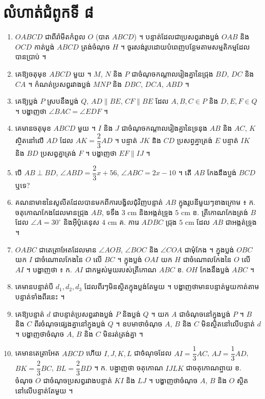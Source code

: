 \section*{លំហាត់ជំពូកទី ៨}
\begin{enumerate}[1]
  \item $OABCD$ ជាពីរ៉ាមីតកំពូល $O$ (បាត $ABCD$) ។ បន្ទាត់ដែលជាប្រសព្វរវាងប្លង់ $OAB$ និង $OCD$ កាត់ប្លង់ $ABCD$ ត្រង់ចំណុច $H$ ។ ចូរសង់រូបដោយបំពេញបន្ថែមតាមសម្មតិកម្មដែលបានប្រាប់ ។
  \item គេឱ្យចតុមុខ $ABCD$ មួយ ។ $M$, $N$ និង $P$ ជាចំណុចកណ្ដាលរៀងគ្នានៃជ្រុង $BD$, $DC$ និង $CA$ ។ កំណត់ប្រសព្វរវាងប្លង់ $MNP$ និង $DBC$, $DCA$, $ABD$ ។
  \item គេឱ្យប្លង់ $P$ ស្របនឹងប្លង់ $Q$, $AD \parallel BE$, $CF \parallel BE$ ដែល $A, B, C \in P$ និង $D, E, F \in Q$ ។ បង្ហាញថា $\angle BAC = \angle EDF$ ។
  \item គេមានចតុមុខ $ABCD$ មួយ ។ $I$ និង $J$ ជាចំណុចកណ្ដាលរៀងគ្នានៃទ្រនុង $AB$ និង $AC$, $K$ ស្ថិតនៅលើ $AD$ ដែល $AK = \dfrac{2}{3}AD$ ។ បន្ទាត់ $JK$ និង $CD$ ប្រសព្វគ្នាត្រង់ $E$ បន្ទាត់ $IK$ និង $BD$ ប្រសព្វគ្នាត្រង់ $F$ ។ បង្ហាញថា $EF \parallel IJ$ ។
  \item បើ $AB \perp BD$, $\angle ABD = \dfrac{2}{3}x + 56$, $\angle ABC = 2x - 10$ ។ តើ $AB$ កែងនឹងប្លង់ $BCD$ ឬទេ?
  \item គណនាមាឌនៃសូលីតដែលបានមកពីការបង្វិលជុំវិញបន្ទាត់ $AB$ ក្នុងរូបនីមួយៗខាងក្រោម ៖ \quad ក. ចតុកោណកែងដែលមានជ្រុង $AB$, ទទឹង $3$ cm និងអង្កត់ទ្រូង $5$ cm \quad ខ. ត្រីកោណកែងត្រង់ $B$ ដែល $\angle A = 30^\circ$ និងអ៊ីប៉ូតេនុស $4$ cm \quad គ. ការេ $ADBC$ ជ្រុង $5$ cm ដែល $AB$ ជាអង្កត់ទ្រូង ។
  \item $OABC$ ជាតេត្រាអែតដែលមាន $\angle AOB$, $\angle BOC$ និង $\angle COA$ ជាមុំកែង ។ ក្នុងប្លង់ $OBC$ យក $I$ ជាចំណោលកែងនៃ $O$ លើ $BC$ ។ ក្នុងប្លង់ $OAI$ យក $H$ ជាចំណោលកែងនៃ $O$ លើ $AI$ ។ បង្ហាញថា ៖ ក. $AI$ ជាកម្ពស់មួយរបស់ត្រីកោណ $ABC$ \quad ខ. $OH$ កែងនឹងប្លង់ $ABC$ ។
  \item គេមានបន្ទាត់បី $d_1, d_2, d_3$ ដែលពីរៗមិនស្ថិតក្នុងប្លង់តែមួយ ។ បង្ហាញថាមានបន្ទាត់មួយកាត់តាមបន្ទាត់ទាំងពីរនេះ ។
  \item គេឱ្យបន្ទាត់ $d$ ជាបន្ទាត់ប្រសព្វរវាងប្លង់ $P$ និងប្លង់ $Q$ ។ យក $A$ ជាចំណុចនៅក្នុងប្លង់ $P$ ។ $B$ និង $C$ ពីរចំណុចផ្សេងគ្នានៅក្នុងប្លង់ $Q$ ។ ឧបមាថាចំណុច $A$, $B$ និង $C$ មិនស្ថិតនៅលើបន្ទាត់ $d$ ។ បង្ហាញថាចំណុច $A$, $B$ និង $C$ មិនរត់ត្រង់គ្នា ។
  \item គេមានតេត្រាអែត $ABCD$ ហើយ $I, J, K, L$ ជាចំណុចដែល $AI = \dfrac{1}{3}AC$, $AJ = \dfrac{1}{3}AD$, $BK = \dfrac{2}{3}BC$, $BL = \dfrac{2}{3}BD$ ។ \quad ក. បង្ហាញថា ចតុកោណ $IJLK$ ជាចតុកោណព្នាយ \quad ខ. ចំណុច $O$ ជាចំណុចប្រសព្វរវាងបន្ទាត់ $KI$ និង $LJ$ ។ បង្ហាញថាចំណុច $A$, $B$ និង $O$ ស្ថិតនៅលើបន្ទាត់តែមួយ ។

\end{enumerate}
